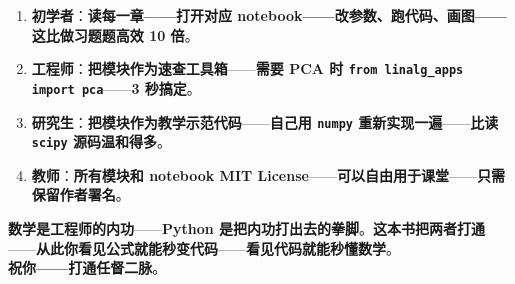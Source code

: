 \begin{enumerate}
\item \textbf{初学者}：\textbf{读每一章——\textbf{打开对应 notebook}——\textbf{改参数、跑代码、画图}——\textbf{这比做习题题高效 10 倍}}。
\item \textbf{工程师}：\textbf{把模块作为\textbf{速查工具箱}}——\textbf{需要 PCA 时 \texttt{from linalg\_apps import pca}}——\textbf{3 秒搞定}。
\item \textbf{研究生}：\textbf{把模块作为\textbf{教学示范代码}}——\textbf{自己用 \texttt{numpy} 重新实现一遍}——\textbf{比读 \texttt{scipy} 源码温和得多}。
\item \textbf{教师}：\textbf{所有模块和 notebook \textbf{MIT License}}——\textbf{可以\textbf{自由用于课堂}}——\textbf{只需保留作者署名}。
\end{enumerate}

\begin{tcolorbox}[essbox={最后一句}]
\textbf{数学是\textbf{工程师的内功}}——\textbf{Python 是\textbf{把内功打出去的拳脚}}。\textbf{这本书把两者打通}——\textbf{从此你看见公式就能\textbf{秒变代码}}——\textbf{看见代码就能\textbf{秒懂数学}}。\\[4pt]
\textbf{祝你——\textbf{打通任督二脉}}。
\end{tcolorbox}

\clearpage

